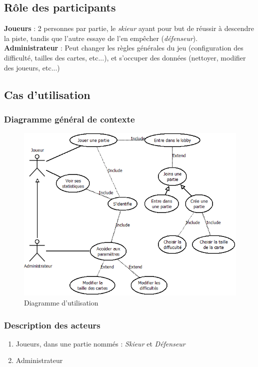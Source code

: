 \documentclass[a4paper,11pt]{article}
\begin{document}
	
	\subsection{Rôle des participants}
	\textbf{Joueurs} : 2 personnes par partie, le \textit{skieur} ayant pour but de réussir à descendre la piste, tandis que l'autre essaye de l'en empêcher (\textit{défenseur}). \\
	
	\textbf{Administrateur} : Peut changer les règles générales du jeu (configuration des difficulté, tailles des cartes, etc...), et s'occuper des données (nettoyer, modifier des joueurs, etc...)
	
	
	\subsection{Cas d'utilisation}
	
	\subsubsection{Diagramme général de contexte}
	\begin{figure}[!ht]
		\centering
		\includegraphics[scale=0.6]{diagramme_utilisation.png}
		\caption{Diagramme d'utilisation}
		\label{fig:diagramme_utilisation}
	\end{figure}

	\subsubsection{Description des acteurs}
	\begin{enumerate}
		\item Joueurs, dans une partie nommés : \textit{Skieur} et \textit{Défenseur}
		\item Administrateur
	\end{enumerate}
\end{document}

